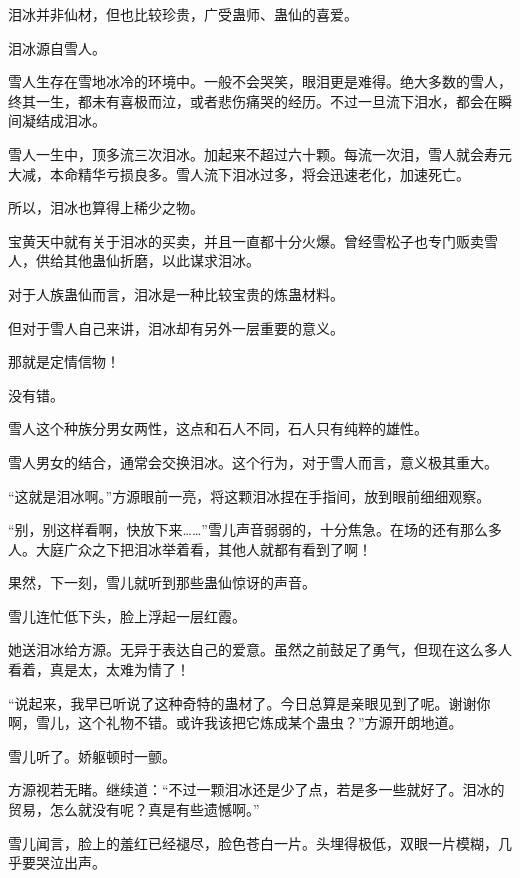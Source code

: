 
\begin{this_body}



泪冰并非仙材，但也比较珍贵，广受蛊师、蛊仙的喜爱。

泪冰源自雪人。

雪人生存在雪地冰冷的环境中。一般不会哭笑，眼泪更是难得。绝大多数的雪人，终其一生，都未有喜极而泣，或者悲伤痛哭的经历。不过一旦流下泪水，都会在瞬间凝结成泪冰。

雪人一生中，顶多流三次泪冰。加起来不超过六十颗。每流一次泪，雪人就会寿元大减，本命精华亏损良多。雪人流下泪冰过多，将会迅速老化，加速死亡。

所以，泪冰也算得上稀少之物。

宝黄天中就有关于泪冰的买卖，并且一直都十分火爆。曾经雪松子也专门贩卖雪人，供给其他蛊仙折磨，以此谋求泪冰。

对于人族蛊仙而言，泪冰是一种比较宝贵的炼蛊材料。

但对于雪人自己来讲，泪冰却有另外一层重要的意义。

那就是定情信物！

没有错。

雪人这个种族分男女两性，这点和石人不同，石人只有纯粹的雄性。

雪人男女的结合，通常会交换泪冰。这个行为，对于雪人而言，意义极其重大。

“这就是泪冰啊。”方源眼前一亮，将这颗泪冰捏在手指间，放到眼前细细观察。

“别，别这样看啊，快放下来……”雪儿声音弱弱的，十分焦急。在场的还有那么多人。大庭广众之下把泪冰举着看，其他人就都有看到了啊！

果然，下一刻，雪儿就听到那些蛊仙惊讶的声音。

雪儿连忙低下头，脸上浮起一层红霞。

她送泪冰给方源。无异于表达自己的爱意。虽然之前鼓足了勇气，但现在这么多人看着，真是太，太难为情了！

“说起来，我早已听说了这种奇特的蛊材了。今日总算是亲眼见到了呢。谢谢你啊，雪儿，这个礼物不错。或许我该把它炼成某个蛊虫？”方源开朗地道。

雪儿听了。娇躯顿时一颤。

方源视若无睹。继续道：“不过一颗泪冰还是少了点，若是多一些就好了。泪冰的贸易，怎么就没有呢？真是有些遗憾啊。”

雪儿闻言，脸上的羞红已经褪尽，脸色苍白一片。头埋得极低，双眼一片模糊，几乎要哭泣出声。


\end{this_body}
